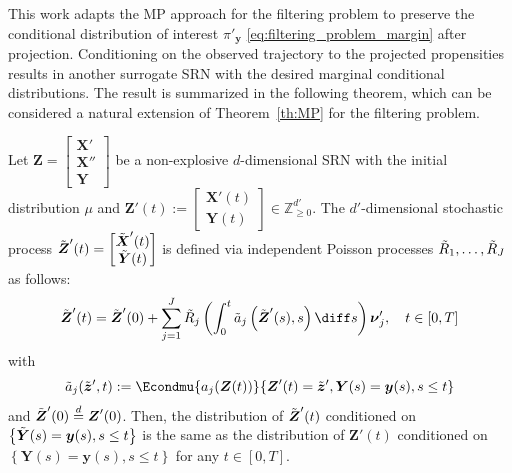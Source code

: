 This work adapts the \ac{MP} approach for the filtering problem to preserve the conditional distribution of interest $\pi'_{\boldsymbol{y}}$ \eqref{eq:filtering_problem_margin} after projection. Conditioning on the observed trajectory to the projected propensities results in another surrogate \ac{SRN} with the desired marginal conditional distributions. The result is summarized in the following theorem, which can be considered a natural extension of Theorem~\ref{th:MP} for the filtering problem.
 
\begin{theorem}
    \label{th:FMP}
    Let 
    $\boldsymbol{Z} = \begin{bmatrix} \boldsymbol{X}' \\ \boldsymbol{X}'' \\ \boldsymbol{Y} \end{bmatrix}$ 
    be a non-explosive $d$-dimensional \ac{SRN} with the initial distribution $\mu$ and $\boldsymbol{Z}'(t) := \begin{bmatrix} \boldsymbol{X}'(t) \\ \boldsymbol{Y}(t)  \end{bmatrix} \in \mathbb{Z}_{\geq 0}^{d'} $. 
    The $d'$-dimensional stochastic process $\Tilde{\boldsymbol{Z}}'(t) = \begin{bmatrix} \Tilde{\boldsymbol{X}}'(t) \\ \Tilde{\boldsymbol{Y}}(t)  \end{bmatrix} $ is defined via independent Poisson processes $\Tilde{R}_1, \dots, \Tilde{R}_J$ as follows:
    \begin{equation}
        \label{eq:FMP_model}
        \Tilde{\boldsymbol{Z}}'(t) = \Tilde{\boldsymbol{Z}}'(0) + \sum_{j=1}^{J} \Tilde{R}_j \left( \int_0^t \Tilde{a}_j \left( \Tilde{\boldsymbol{Z}}'(s), s \right) \diff s \right) \boldsymbol{\nu}_{j}' , \quad t \in [0,T]
    \end{equation}
    with 
    \begin{equation}
    \label{eq:FMP_a_tilde_def}
        \Tilde{a}_j (\Tilde{\boldsymbol{z}}', t) := \Econdmu{ a_j(\boldsymbol{Z}(t)) }{ \boldsymbol{Z}'(t) = \Tilde{\boldsymbol{z}}', \boldsymbol{Y}(s) = \boldsymbol{y}(s) , s \leq t}
    \end{equation}
    and $\Tilde{\boldsymbol{Z}}'(0) \overset{d}{=} \boldsymbol{Z}'(0)$. Then, the distribution of $\Tilde{\boldsymbol{Z}}'(t)$ conditioned on $\left\{ \Tilde{\boldsymbol{Y}}(s) = \boldsymbol{y}(s), s \leq t \right\}$ is the same as the distribution of $\boldsymbol{Z}'(t)$ conditioned on $\left\{ \boldsymbol{Y}(s) = \boldsymbol{y}(s), s \leq t \right\}$ for any $t \in [0, T]$.
\end{theorem}

